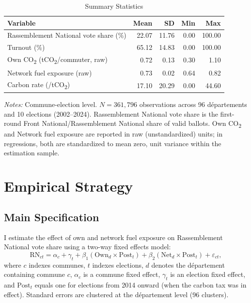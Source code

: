 \documentclass[12pt]{article}
\providecommand{\euro}{\texteuro}
\newcommand{\rn}{Rassemblement National}
\newcommand{\fn}{Front National}
\newcommand{\dept}{d\'{e}partement}
\newcommand{\depts}{d\'{e}partements}
\begin{document}
\begin{table}[H]
\centering
\caption{Summary Statistics}
\label{tab:summary}
\begin{threeparttable}
\begin{tabular}{@{}lrrrr@{}}
\toprule
Variable & Mean & SD & Min & Max \\
\midrule
\rn{} vote share (\%) & 22.07 & 11.76 & 0.00 & 100.00 \\
Turnout (\%) & 65.12 & 14.83 & 0.00 & 100.00 \\
Own CO\textsubscript{2} (tCO\textsubscript{2}/commuter, raw) & 0.72 & 0.13 & 0.30 & 1.10 \\
Network fuel exposure (raw) & 0.73 & 0.02 & 0.64 & 0.82 \\
Carbon rate (\euro/tCO\textsubscript{2}) & 17.10 & 20.29 & 0.00 & 44.60 \\
\bottomrule
\end{tabular}
\begin{tablenotes}
\small
\item \textit{Notes:} Commune-election level. $N = 361{,}796$ observations across 96 \depts{} and 10 elections (2002--2024). \rn{} vote share is the first-round \fn{}/\rn{} share of valid ballots. Own CO\textsubscript{2} and Network fuel exposure are reported in raw (unstandardized) units; in regressions, both are standardized to mean zero, unit variance within the estimation sample.
\end{tablenotes}
\end{threeparttable}
\end{table}



\section{Empirical Strategy}
\label{sec:strategy}

\subsection{Main Specification}

I estimate the effect of own and network fuel exposure on \rn{} vote share using a two-way fixed effects model:
\begin{equation}
\text{RN}_{ct} = \alpha_c + \gamma_t + \beta_1 (\text{Own}_d \times \text{Post}_t) + \beta_2 (\text{Net}_d \times \text{Post}_t) + \varepsilon_{ct},
\label{eq:main}
\end{equation}
where $c$ indexes communes, $t$ indexes elections, $d$ denotes the \dept{} containing commune $c$, $\alpha_c$ is a commune fixed effect, $\gamma_t$ is an election fixed effect, and $\text{Post}_t$ equals one for elections from 2014 onward (when the carbon tax was in effect). Standard errors are clustered at the \dept{} level (96 clusters).
\end{document}
